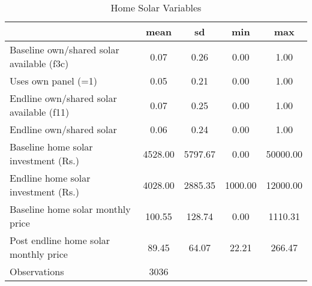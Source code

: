 \begin{table}[htbp]\centering
\def\sym#1{\ifmmode^{#1}\else\(^{#1}\)\fi}
\caption{Home Solar Variables\label {tab1}}
\begin{tabular}{l*{1}{cccc}}
\toprule
                    &        mean&          sd&         min&         max\\
\midrule
Baseline own/shared solar available (f3c)&        0.07&        0.26&        0.00&        1.00\\
Uses own panel (=1) &        0.05&        0.21&        0.00&        1.00\\
Endline own/shared solar available (f11)&        0.07&        0.25&        0.00&        1.00\\
Endline own/shared solar&        0.06&        0.24&        0.00&        1.00\\
Baseline home solar investment (Rs.)&     4528.00&     5797.67&        0.00&    50000.00\\
Endline home solar investment (Rs.)&     4028.00&     2885.35&     1000.00&    12000.00\\
Baseline home solar monthly price&      100.55&      128.74&        0.00&     1110.31\\
Post endline home solar monthly price&       89.45&       64.07&       22.21&      266.47\\
\midrule
Observations        &        3036&            &            &            \\
\bottomrule
\end{tabular}
\end{table}
